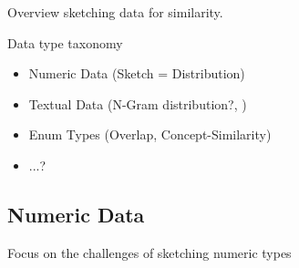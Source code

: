 
Overview sketching data for similarity.  

Data type taxonomy
\begin{itemize}
  \item Numeric Data (Sketch = Distribution)
  \item Textual Data (N-Gram distribution?, )
  \item Enum Types (Overlap, Concept-Similarity)
  \item ...?
\end{itemize}

\subsection{Numeric Data}
Focus on the challenges of sketching numeric types

